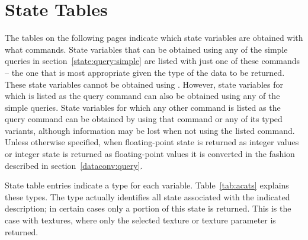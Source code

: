 
\chapter{State Tables}                                              %
\label{state:tables}

The tables on the following pages indicate which state variables are
obtained with what commands. State variables that can be obtained using any
of the simple queries in section~\ref{state:query:simple}
are listed with just one of these
commands -- the one that is most appropriate given the type of the data to
be returned. These state variables cannot be obtained using .
However, state variables for which  is listed as the query
command can also be obtained using any of the simple queries.
State variables
for which any other command is listed as the query command can be obtained
by using that command or any of its typed variants, although information may
be lost when not using the listed command. Unless otherwise specified, when
floating-point state is returned as integer values or integer state is
returned as floating-point values it is converted in the fashion described
in section~\ref{dataconv:query}.


State table entries indicate a type for each variable. Table~\ref{tab:acats}
explains these types. The type actually identifies all state associated with
the indicated description; in certain cases only a portion of this state is
returned. This is the case
with textures, where only the selected texture or texture parameter is
returned.

